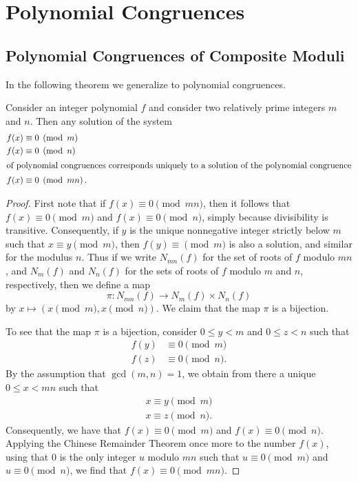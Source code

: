 \chapter{Polynomial Congruences}\label{chapter:polynomial-congruences}

\section{Polynomial Congruences of Composite Moduli}

In the following theorem we generalize  to polynomial congruences.

\begin{theorem}
  Consider an integer polynomial $f$ and consider two relatively prime integers $m$ and $n$. Then any solution of the system
  \begin{align*}
    f(x) & \equiv 0 \pmod{m} \\
    f(x) & \equiv 0 \pmod{n} \\  
  \intertext{of polynomial congruences corresponds uniquely to a solution of the polynomial congruence}
    f(x) & \equiv 0 \pmod{mn}.
  \end{align*}
\end{theorem}

\begin{proof}
  First note that if $f(x)\equiv 0\pmod{mn}$, then it follows that $f(x)\equiv 0\pmod{m}$ and $f(x)\equiv 0\pmod{n}$, simply because divisibility is transitive.
  Consequently, if $y$ is the unique nonnegative integer strictly below $m$ such that $x\equiv y\pmod{m}$, then $f(y)\equiv \pmod{m}$ is also a solution, and similar for the modulus $n$. Thus if we write $N_{mn}(f)$ for the set of roots of $f$ modulo $mn$, and $N_m(f)$ and $N_n(f)$ for the sets of roots of $f$ modulo $m$ and $n$, respectively, then we define a map
  \begin{equation*}
    \pi : N_{mn}(f)\to N_m(f)\times N_n(f)
  \end{equation*}
  by $x\mapsto (x\pmod{m},x\pmod{n})$. We claim that the map $\pi$ is a bijection.

  To see that the map $\pi$ is a bijection, consider $0\leq y<m$ and $0\leq z<n$ such that
  \begin{align*}
    f(y) & \equiv 0 \pmod{m} \\
    f(z) & \equiv 0 \pmod{n}.
  \end{align*}
  By the assumption that $\gcd(m,n)=1$, we obtain from  there a unique $0\leq x < mn$ such that
  \begin{align*}
    x \equiv y \pmod {m} \\
    x \equiv z \pmod {n}.
  \end{align*}
  Consequently, we have that $f(x)\equiv 0\pmod{m}$ and $f(x)\equiv 0\pmod{n}$.
  Applying the Chinese Remainder Theorem once more to the number $f(x)$, using that $0$ is the only integer $u$ modulo $mn$ such that $u\equiv 0\pmod{m}$ and $u\equiv 0\pmod{n}$, we find that $f(x)\equiv 0\pmod{mn}$.
\end{proof}

